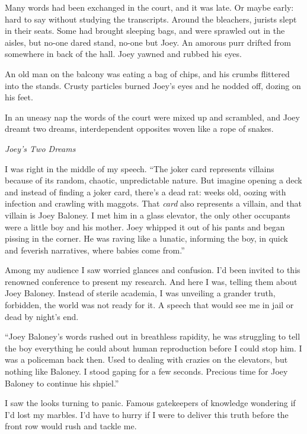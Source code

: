 \documentclass[oneside]{book}
\begin{document}
Many words had been exchanged in the court, and it was late.
Or maybe early: hard to say without studying the
transcripts.  Around the bleachers, jurists slept in their seats.
Some had brought sleeping bags, and were
sprawled out in the aisles, but no-one dared stand, no-one but
Joey.  An amorous purr drifted from somewhere in back of the
hall.  Joey yawned and rubbed
his eyes.

An old man on the balcony was eating a bag of
chips, and his crumbs flittered into the stands.
Crusty particles burned Joey's eyes and he
nodded off, dozing on his feet.

In an uneasy nap the words of the court were mixed up and
scrambled, and Joey dreamt two dreams, interdependent opposites
woven like a rope of snakes.

\vspace{2mm}
\noindent \textit{Joey's Two Dreams}
\vspace{2mm}

I was right in the middle of my speech.
``The joker card represents villains because of its
random, chaotic, unpredictable nature.  But imagine opening a
deck and instead of finding a joker card, there's a dead rat:
weeks old,
oozing with infection and crawling with maggots.  That \emph{card} also represents a villain,
and that villain is Joey Baloney.
I met him in a glass elevator, the only other occupants were a little boy and his mother.
Joey whipped it out of his pants and began pissing in the corner.  He was raving like a lunatic,
informing the boy, in quick and feverish narratives, where babies come from.''

Among my audience I saw worried glances and confusion.  I'd been invited to this renowned conference
to present my research.  And here I was, telling them about Joey Baloney.
Instead of sterile academia, I was unveiling a grander truth, forbidden,
the world was not ready for it.
A speech that would see me in jail or dead by night's end.

``Joey Baloney's words rushed out in breathless rapidity, he was struggling to tell the
boy everything he could about human reproduction before I could stop him.
I was a policeman back then.  Used to dealing with crazies on the elevators,
but nothing like Baloney.
I stood gaping for a few seconds.  Precious time for Joey Baloney to continue his shpiel.''

I saw the looks turning to panic.  Famous gatekeepers of knowledge wondering if I'd lost my
marbles.  I'd have to hurry if I were to deliver this truth before the front row would
rush and tackle me.
\end{document}
